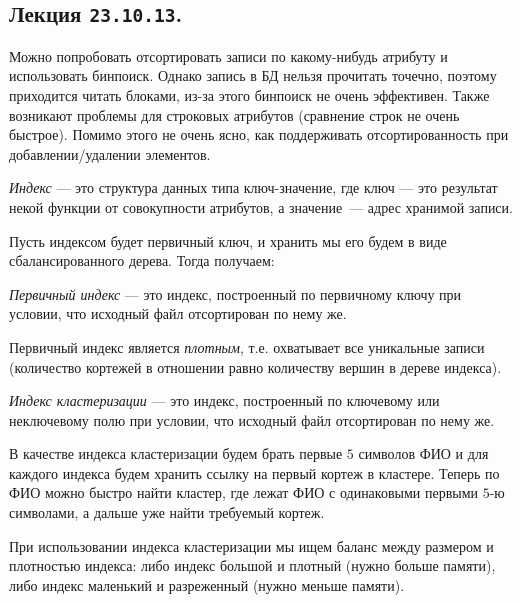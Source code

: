 \subsection{%
  Лекция \texttt{23.10.13}.%
}


Можно попробовать отсортировать записи по какому-нибудь атрибуту и использовать
бинпоиск. Однако запись в БД нельзя прочитать точечно, поэтому приходится читать
блоками, из-за этого бинпоиск не очень эффективен. Также возникают проблемы для
строковых атрибутов (сравнение строк не очень быстрое). Помимо этого не очень
ясно, как поддерживать отсортированность при добавлении/удалении элементов.

\begin{definition}
  \textit{Индекс} --- это структура данных типа ключ-значение,
  где ключ --- это результат некой функции от совокупности атрибутов, 
  а значение~--- адрес хранимой записи.
\end{definition}

Пусть индексом будет первичный ключ, и хранить мы его будем в виде
сбалансированного дерева. Тогда получаем:
\begin{definition}
  \textit{Первичный индекс} --- это индекс, построенный по первичному ключу при условии,
  что исходный файл отсортирован по нему же.
\end{definition}

Первичный индекс является \textit{плотным}, т.е. охватывает все уникальные записи
(количество кортежей в отношении равно количеству вершин в дереве индекса).

\begin{definition}
  \textit{Индекс кластеризации} --- это индекс, построенный по ключевому или
  неключевому полю при условии, что исходный файл отсортирован по нему же.
\end{definition}

\begin{example}
  В качестве индекса кластеризации будем брать первые \(5\) символов ФИО и для
  каждого индекса будем хранить ссылку на первый кортеж в кластере. Теперь по
  ФИО можно быстро найти кластер, где лежат ФИО с одинаковыми первыми \(5\)-ю
  символами, а дальше уже найти требуемый кортеж.
\end{example}

\begin{remark}
  При использовании индекса кластеризации мы ищем баланс между размером и
  плотностью индекса: либо индекс большой и плотный (нужно больше памяти), либо
  индекс маленький и разреженный (нужно меньше памяти).
\end{remark}

